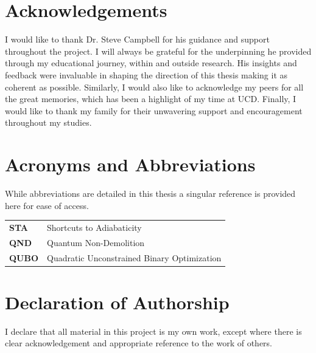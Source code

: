 \vspace{2.5cm}
\section*{Acknowledgements}
\qquad I would like to thank Dr. Steve Campbell for his guidance and support throughout the project. I will always be grateful for the underpinning he provided through my educational journey, within and outside research. His insights and feedback were invaluable in shaping the direction of this thesis making it as coherent as possible. Similarly,  I would also like to acknowledge my peers for all the great memories, which has been a highlight of my time at UCD. Finally, I would like to thank my family for their unwavering support and encouragement throughout my studies.
\newpage


\section*{Acronyms and Abbreviations}
    While abbreviations are detailed in this thesis a singular reference is provided here for ease of access.

    \begin{table}[h]
    \centering
    \begin{tabular}{p{3cm}  p{8cm}}
    \textbf{STA}\label{acr:STA} & Shortcuts to Adiabaticity \\[7pt]
    \textbf{QND}\label{acr:QND} & Quantum Non-Demolition \\[7pt]
    \textbf{QUBO}\label{acr:QUBO} & Quadratic Unconstrained Binary Optimization \\[7pt]
    \end{tabular}
\end{table}

\vspace{2.5cm}
\section*{Declaration of Authorship}
\qquad I declare that all material in this project is my own work, except where there is clear acknowledgement and appropriate reference to the work of others.

\singlespacing
\newpage
\listoffigures

\newpage

\tableofcontents